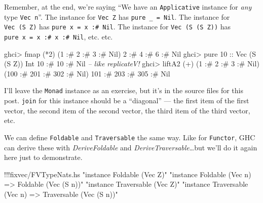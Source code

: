 \documentclass[]{article}
\newenvironment{Shaded}{}{}
\newcommand{\DataTypeTok}[1]{\textcolor[rgb]{0.56,0.13,0.00}{{#1}}}
\newcommand{\DecValTok}[1]{\textcolor[rgb]{0.25,0.63,0.44}{{#1}}}
\newcommand{\StringTok}[1]{\textcolor[rgb]{0.25,0.44,0.63}{{#1}}}
\newcommand{\CommentTok}[1]{\textcolor[rgb]{0.38,0.63,0.69}{\textit{{#1}}}}
\newcommand{\OtherTok}[1]{\textcolor[rgb]{0.00,0.44,0.13}{{#1}}}
\newcommand{\FunctionTok}[1]{\textcolor[rgb]{0.02,0.16,0.49}{{#1}}}
\newcommand{\NormalTok}[1]{{#1}}
\begin{document}
Remember, at the end, we're saying ``We have an \texttt{Applicative}
instance for \emph{any} type \texttt{Vec\ n}''. The instance for
\texttt{Vec\ Z} has \texttt{pure\ \_\ =\ Nil}. The instance for
\texttt{Vec\ (S\ Z)} has \texttt{pure\ x\ =\ x\ :\#\ Nil}. The instance
for \texttt{Vec\ (S\ (S\ Z))} has
\texttt{pure\ x\ =\ x\ :\#\ x\ :\#\ Nil}, etc. etc.

\begin{Shaded}
\begin{Highlighting}[]
\NormalTok{ghci}\FunctionTok{>} \NormalTok{fmap (}\FunctionTok{*}\DecValTok{2}\NormalTok{) (}\DecValTok{1} \FunctionTok{:#} \DecValTok{2} \FunctionTok{:#} \DecValTok{3} \FunctionTok{:#} \DataTypeTok{Nil}\NormalTok{)}
\DecValTok{2} \FunctionTok{:#} \DecValTok{4} \FunctionTok{:#} \DecValTok{6} \FunctionTok{:#} \DataTypeTok{Nil}
\NormalTok{ghci}\FunctionTok{>} \NormalTok{pure }\DecValTok{10}\OtherTok{ ::} \DataTypeTok{Vec} \NormalTok{(}\DataTypeTok{S} \NormalTok{(}\DataTypeTok{S} \DataTypeTok{Z}\NormalTok{)) }\DataTypeTok{Int}
\DecValTok{10} \FunctionTok{:#} \DecValTok{10} \FunctionTok{:#} \DataTypeTok{Nil}         \CommentTok{-- like replicateV!}
\NormalTok{ghci}\FunctionTok{>} \NormalTok{liftA2 (}\FunctionTok{+}\NormalTok{) (}\DecValTok{1} \FunctionTok{:#} \DecValTok{2} \FunctionTok{:#} \DecValTok{3} \FunctionTok{:#} \DataTypeTok{Nil}\NormalTok{) (}\DecValTok{100} \FunctionTok{:#} \DecValTok{201} \FunctionTok{:#} \DecValTok{302} \FunctionTok{:#} \DataTypeTok{Nil}\NormalTok{)}
\DecValTok{101} \FunctionTok{:#} \DecValTok{203} \FunctionTok{:#} \DecValTok{305} \FunctionTok{:#} \DataTypeTok{Nil}
\end{Highlighting}
\end{Shaded}

I'll leave the \texttt{Monad} instance as an exercise, but it's in the
source files for this post. \texttt{join} for this instance should be a
``diagonal'' --- the first item of the first vector, the second item of
the second vector, the third item of the third vector, etc.

We can define \texttt{Foldable} and \texttt{Traversable} the same way.
Like for \texttt{Functor}, GHC can derive these with
\emph{DeriveFoldable} and \emph{DeriveTraversable}\ldots{}but we'll do
it again here just to demonstrate.

\begin{Shaded}
\begin{Highlighting}[]
\FunctionTok{!!!}\NormalTok{fixvec}\FunctionTok{/}\NormalTok{FVTypeNats.hs }\StringTok{"instance Foldable (Vec Z)"} \StringTok{"instance Foldable (Vec n) => Foldable (Vec (S n))"} \StringTok{"instance Traversable (Vec Z)"} \StringTok{"instance Traversable (Vec n) => Traversable (Vec (S n))"}
\end{Highlighting}
\end{Shaded}
\end{document}
